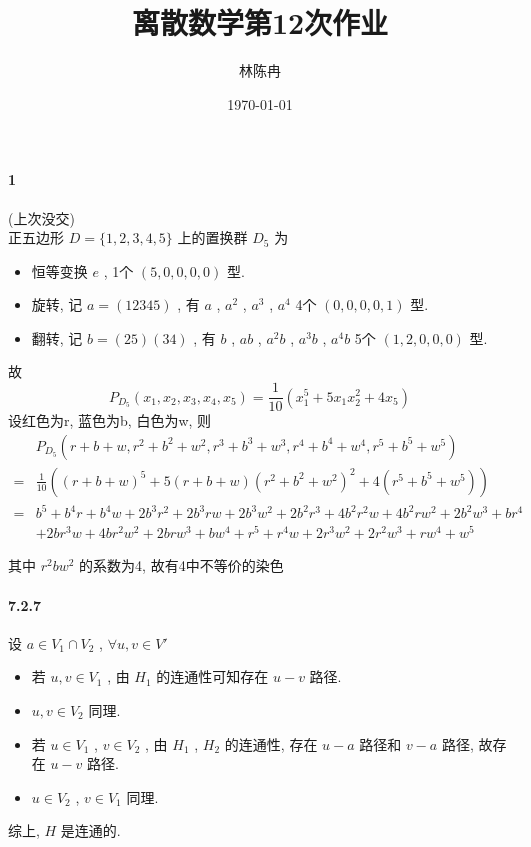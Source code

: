 \documentclass[a4paper, UTF8]{ctexart}				%
\title{离散数学第12次作业}
\author{林陈冉}
\date{\today}
\numberwithin{equation}{section}				%
\begin{document}
    \maketitle										%
    \paragraph{1} 
        (上次没交)\\
        正五边形 $D = \{1,2,3,4,5\}$ 上的置换群 $D_5$ 为 
        \begin{itemize}
            \item 恒等变换 $e$ , 1个 $(5,0,0,0,0)$ 型.
            \item 旋转, 记 $a = (12345)$ , 有 $a$ , $a^2$ , $a^3$ , $a^4$ 4个 $(0,0,0,0,1)$ 型.
            \item 翻转, 记 $b = (25)(34)$ , 有 $b$ , $ab$ , $a^2b$ , $a^3b$ , $a^4b$ 5个 $(1,2,0,0,0)$ 型.
        \end{itemize}
        故 
        \[
            P_{D_5}(x_1, x_2, x_3, x_4, x_5) = \frac{1}{10} (x_1^5 + 5x_1x_2^2 + 4x_5)
        \]
        设红色为r, 蓝色为b, 白色为w, 则 
        \[
            \begin{split}
              & P_{D_5}(r+b+w, r^2+b^2+w^2, r^3+b^3+w^3, r^4+b^4+w^4, r^5+b^5+w^5)\\
            = & \frac{1}{10}\left(\left(r+b+w\right)^5 + 5\left(r+b+w\right)\left(r^2+b^2+w^2\right)^2 + 4\left(r^5+b^5+w^5\right)\right)\\
            = & b^5+b^4 r+b^4 w+2 b^3 r^2+2 b^3 r w+2 b^3 w^2+2 b^2 r^3+4 b^2 r^2 w+4 b^2 r w^2+2 b^2 w^3+b r^4\\
              & +2 b r^3 w+4 b r^2 w^2+2 b r w^3+b w^4+r^5+r^4 w+2 r^3 w^2+2 r^2 w^3+r w^4+w^5
            \end{split}
        \]
        
        其中 $r^2bw^2$ 的系数为4, 故有4中不等价的染色

    \paragraph{7.2.7}\quad 
        设 $a \in V_1 \cap V_2$ , $\forall u, v \in V'$ 
        \begin{itemize}
            \item 若 $u, v \in V_1$ , 由 $H_1$ 的连通性可知存在 $u-v$ 路径.
            \item $u, v \in V_2$ 同理.
            \item 若 $u \in V_1$ , $v \in V_2$ , 由 $H_1$ , $H_2$ 的连通性, 存在 $u-a$ 路径和 $v-a$ 路径, 故存在 $u-v$ 路径.
            \item $u \in V_2$ , $v \in V_1$ 同理.
        \end{itemize}
        综上, $H$ 是连通的.
\end{document}
